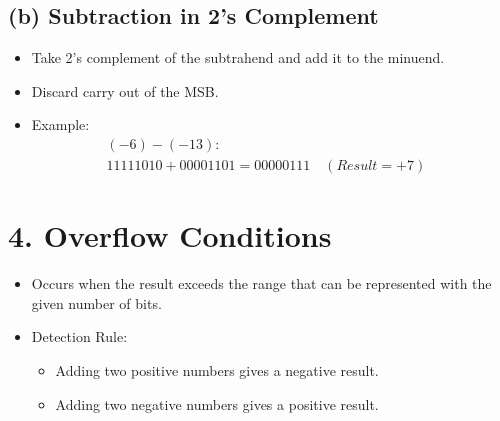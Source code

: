 \documentclass[a4paper,12pt]{article}
\begin{document}
\subsection*{(b) Subtraction in 2's Complement}
\begin{itemize}
    \item Take 2's complement of the subtrahend and add it to the minuend.
    \item Discard carry out of the MSB.
    \item Example:
    \begin{align*}
        (-6) - (-13): & \\
        11111010 + 00001101 = 00000111 \quad (Result = +7)
    \end{align*}
\end{itemize}

\section*{4. Overflow Conditions}
\begin{itemize}
    \item Occurs when the result exceeds the range that can be represented with the given number of bits.
    \item Detection Rule:
    \begin{itemize}
        \item Adding two positive numbers gives a negative result.
        \item Adding two negative numbers gives a positive result.
    \end{itemize}
\end{itemize}
\end{document}
